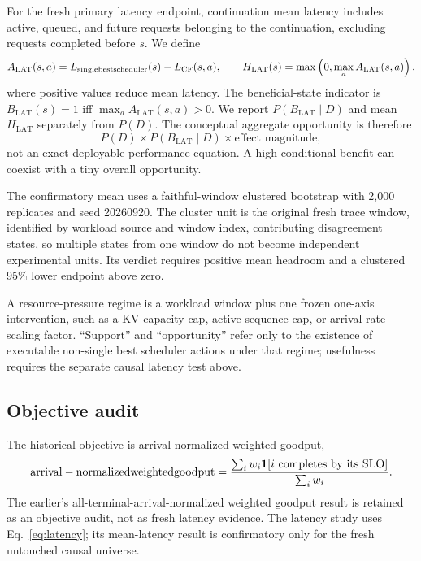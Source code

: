\documentclass[preprint,12pt]{elsarticle}
\begin{document}
For the fresh primary latency endpoint, continuation mean latency includes
active, queued, and future requests belonging to the continuation, excluding
requests completed before $s$. We define
\begin{equation}
 A_{\mathrm{LAT}}(s,a)=L_{\mathrm{single best scheduler}}(s)-L_{\mathrm{CF}}(s,a),
 \qquad
 H_{\mathrm{LAT}}(s)=\max\left(0,\max_aA_{\mathrm{LAT}}(s,a)\right),
 \label{eq:latency}
\end{equation}
where positive values reduce mean latency. The beneficial-state indicator is
$B_{\mathrm{LAT}}(s)=1$ iff $\max_aA_{\mathrm{LAT}}(s,a)>0$. We report
$P(B_{\mathrm{LAT}}\mid D)$ and mean $H_{\mathrm{LAT}}$ separately from
$P(D)$. The conceptual aggregate opportunity is therefore
\begin{equation}
 P(D)\times P(B_{\mathrm{LAT}}\mid D)\times
 \text{effect magnitude},
 \label{eq:decomposition}
\end{equation}
not an exact deployable-performance equation. A high conditional benefit can
coexist with a tiny overall opportunity.

The confirmatory mean uses a faithful-window clustered bootstrap with 2,000
replicates and seed 20260920. The cluster unit is the original fresh trace
window, identified by workload source and window index, contributing
disagreement states, so multiple states from one window do not become
independent experimental units. Its verdict requires positive mean headroom
and a clustered 95\% lower endpoint above zero.

A resource-pressure regime is a workload window plus one frozen one-axis
intervention, such as a KV-capacity cap, active-sequence cap, or arrival-rate
scaling factor. ``Support'' and ``opportunity'' refer only to the existence
of executable non-single best scheduler actions under that regime; usefulness requires the
separate causal latency test above.

\subsection{Objective audit}
The historical objective is arrival-normalized weighted goodput,
\begin{equation}
 \mathrm{arrival-normalized weighted goodput} = \frac{\sum_iw_i\mathbf{1}[i\text{ completes by its SLO}]}{\sum_iw_i}.
 \label{eq:anwg}
\end{equation}
The earlier's all-terminal-arrival-normalized weighted goodput result is retained as an objective audit, not
as fresh latency evidence. The latency study uses Eq.~\ref{eq:latency}; its
mean-latency result is confirmatory only for the fresh untouched causal
universe.
\end{document}
